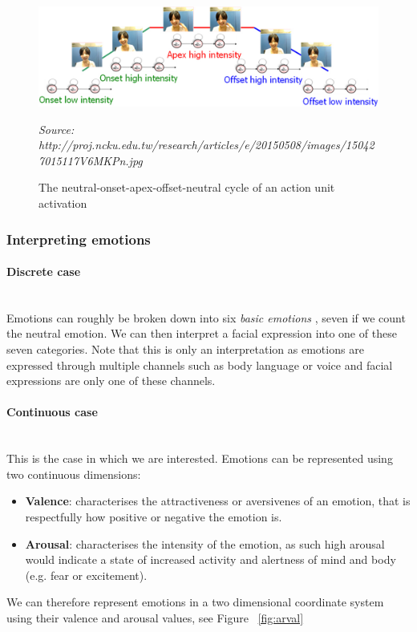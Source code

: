 \documentclass[12pt,twoside]{article}
\newcommand{\source}[1]{\vspace{-3pt} \caption*{ \footnotesize{\textit{Source: {#1}}}} }
\newcommand{\para}[1]{\paragraph{#1}\mbox{}\\}
\begin{document}
\begin{figure}[ht]
  \centering
  \includegraphics[width=1\textwidth]{figures/onset.jpg}
  \caption{The neutral-onset-apex-offset-neutral cycle of an action unit
  activation}
  \source{http://proj.ncku.edu.tw/research/articles/e/20150508/images/150427015117V6MKPn.jpg}
  \label{fig:onset}
\end{figure}

\subsubsection{Interpreting emotions}

\para{Discrete case}
Emotions can roughly be broken down into six \textit{basic emotions} \cite{RefWorks:12}, 
seven if we count the neutral emotion. We can then interpret a facial expression into 
one of these seven categories. Note that this is only an interpretation as emotions 
are expressed through multiple channels such as body language or voice and facial 
expressions are only one of these channels.


\para{Continuous case}
This is the case in which we are interested. Emotions can be represented using two continuous dimensions:

\begin{itemize}
\item \textbf{Valence}: characterises the attractiveness or aversivenes of an emotion, that is respectfully how positive or negative the emotion is.
\item \textbf{Arousal}: characterises the intensity of the emotion, as such high
  arousal would indicate a state of increased activity and alertness of mind and body
  (e.g. fear or excitement).
\end{itemize}

We can therefore represent emotions in a two dimensional coordinate system using their valence and arousal values, see Figure ~\ref{fig:arval} 
\end{document}
